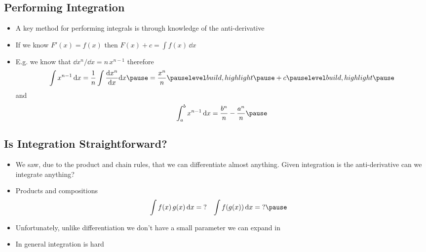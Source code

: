 \Outline %

\begin{slide}
\section{Performing Integration}

\begin{PauseHighLight}
  \begin{itemize}
  \item A key method for performing integrals is through knowledge of
    the anti-derivative\pause
  \item If we know $F'(x) = f(x)$ then $F(x) + c = \int f(x)\, \dd
    x$\pause
  \item E.g. we know that $\dd x^n/ \dd x = n\, x^{n-1}$ therefore
    \begin{align*}
      \int x^{n-1} \, \dd x = \frac{1}{n} \int \frac{\dd x^{n}}{\dd x}
      \dd x \pause= \frac{x^n}{n}\pauseb + c\pauseb
    \end{align*}
    and
    \begin{align*}
      \int_a^b x^{n-1} \, \dd x = \frac{b^n}{n} - \frac{a^n}{n} \pause
    \end{align*}
  \end{itemize}
\end{PauseHighLight}

\end{slide}


\begin{slide}
\section[-2]{Is Integration Straightforward?}

\begin{PauseHighLight}\squeeze
  \begin{itemize}
  \item We saw, due to the product and chain rules, that we can
    differentiate almost anything\pause.  Given integration is the
    anti-derivative can we integrate anything?\pauseb
  \item Products and compositions
    \begin{align*}
      \int f(x) \, g(x) \, \dd x &=\; ? &  \int f(g(x)) \, \dd x  &= \;?\pause
    \end{align*}
  \item Unfortunately, unlike differentiation we don't have a small
    parameter we can expand in\pause
  \item In general integration is hard\pause
  \end{itemize}
\end{PauseHighLight}

\end{slide}

